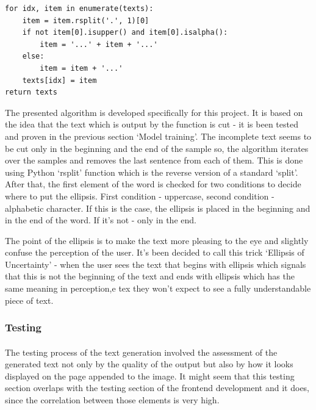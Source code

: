 \documentclass[12pt]{report}
\newenvironment{code}{\captionsetup{type=listing}}{}
\begin{document}
\begin{code}
\begin{verbatim}
for idx, item in enumerate(texts):
    item = item.rsplit('.', 1)[0]
    if not item[0].isupper() and item[0].isalpha():
        item = '...' + item + '...'
    else:
        item = item + '...'
    texts[idx] = item
return texts
\end{verbatim}
\end{code}

The presented algorithm is developed specifically for this project. It is based on the idea that the text which is
output by the function is cut - it is been tested and proven in the previous section `Model training'. The incomplete
text seems to be cut only in the beginning and the end of the sample so, the algorithm iterates over the samples and
removes the last sentence from each of them. This is done using Python `rsplit' function which is the reverse version
of a standard `split'. After that, the first element of the word is checked for two conditions to decide where to put
the ellipsis. First condition - uppercase, second condition - alphabetic character. If this is the case, the ellipsis
is placed in the beginning and in the end of the word. If it's not - only in the end.

The point of the ellipsis is to make the text more pleasing to the eye and slightly confuse the perception of the user.
It's been decided to call this trick `Ellipsis of Uncertainty' - when the user sees the text that begins with 
ellipsis which signals that this is not the beginning of the text and ends with ellipsis which has the same meaning
in perception,e tex they won't expect to see a fully understandable piece of text.

\subsubsection*{Testing}
\paragraph{}
The testing process of the text generation involved the assessment of the generated text not only by the quality of
the output but also by how it looks displayed on the page appended to the image. It might seem that this testing
section overlaps with the testing section of the frontend development and it does, since the correlation between 
those elements is very high.
\end{document}
